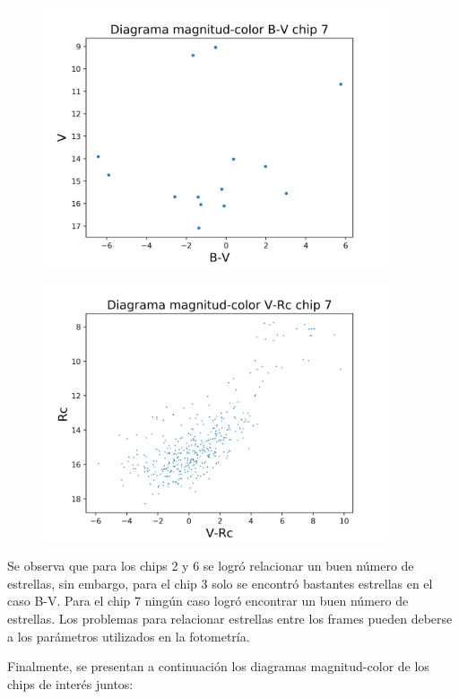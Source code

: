 \documentclass[12pt]{article}
\begin{document}
\begin{figure}[H]
  \centering
   \includegraphics[width = 4in]{B-V7.png}
\end{figure}
\begin{figure}[H]
  \centering
   \includegraphics[width = 4in]{V-Rc7.png}
\end{figure}
   
  Se observa que para los chips 2 y 6 se logró relacionar un buen número de estrellas, sin embargo, para el chip 3 solo se encontró bastantes estrellas en el caso B-V. Para el chip 7 ningún caso logró encontrar un buen número de estrellas. Los problemas para relacionar estrellas entre los frames pueden deberse a los parámetros utilizados en la fotometría.

Finalmente, se presentan a continuación los diagramas magnitud-color de los chips de interés juntos:
\end{document}

